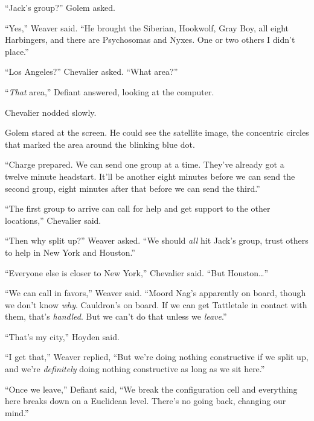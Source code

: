 ``Jack's group?'' Golem asked.



``Yes,'' Weaver said.  ``He brought the Siberian, Hookwolf, Gray Boy, all eight Harbingers, and there are Psychosomas and Nyxes.  One or two others I didn't place.''



``Los Angeles?'' Chevalier asked.  ``What area?''



``\emph{That} area,'' Defiant answered, looking at the computer.



Chevalier nodded slowly.



Golem stared at the screen.  He could see the satellite image, the concentric circles that marked the area around the blinking blue dot.



``Charge prepared.  We can send one group at a time.  They've already got a twelve minute headstart.  It'll be another eight minutes before we can send the second group, eight minutes after that before we can send the third.''



``The first group to arrive can call for help and get support to the other locations,'' Chevalier said.



``Then why split up?'' Weaver asked.  ``We should \emph{all} hit Jack's group, trust others to help in New York and Houston.''



``Everyone else is closer to New York,'' Chevalier said.  ``But Houston\ldots''



``We can call in favors,'' Weaver said.  ``Moord Nag's apparently on board, though we don't know \emph{why}.  Cauldron's on board.  If we can get Tattletale in contact with them, that's \emph{handled}.  But we can't do that unless we \emph{leave}.''



``That's my city,'' Hoyden said.



``I get that,'' Weaver replied, ``But we're doing nothing constructive if we split up, and we're \emph{definitely} doing nothing constructive as long as we sit here.''



``Once we leave,'' Defiant said, ``We break the configuration cell and everything here breaks down on a Euclidean level.  There's no going back, changing our mind.''



